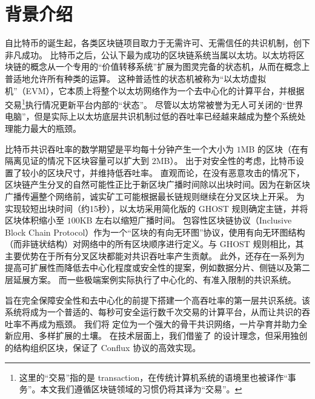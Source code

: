 

\section{背景介绍}


自比特币的诞生起，各类区块链项目取力于无需许可、无需信任的共识机制，创下非凡成功。
比特币之后，公认下最为成功的区块链系统当属以太坊。以太坊将区块链的概念从一个专用的“价值转移系统”扩展为图灵完备的状态机，从而在概念上普适地允许所有种类的运算。
这种普适性的状态机被称为“以太坊虚拟机”（EVM），它本质上将整个以太坊网络作为一个去中心化的计算平台，并根据交易\footnote{这里的“交易”指的是 transaction，在传统计算机系统的语境里也被译作“事务”。本文我们遵循区块链领域的习惯仍将其译为“交易”。}执行情况更新平台内部的“状态”。
尽管以太坊常被誉为无人可关闭的“世界电脑”，但是实际上以太坊底层共识机制过低的吞吐率已经越来越成为整个系统处理能力最大的瓶颈。


比特币共识吞吐率的数学期望是平均每十分钟产生一个大小为 $1$MB 的区块（在有隔离见证的情况下区块容量可以扩大到 $2$MB）。
出于对安全性的考虑，比特币设置了较小的区块尺寸，并维持低吞吐率。
直观而论，在没有恶意攻击的情况下，区块链产生分叉的自然可能性正比于新区块广播时间除以出块时间。因为在新区块广播传遍整个网络前，诚实矿工可能根据最长链规则继续在分叉区块上开采。
为实现较短出块时间（约15秒），以太坊采用简化版的 GHOST 规则\cite{GHOST}确定主链，并将区块体积缩小至 $100$KB 左右以缩短广播时间。
包容性区块链协议（Inclusive Block Chain Protocol）\cite{Inclusive}作为一个“区块的有向无环图”协议，使用有向无环图结构（而非链状结构）对网络中的所有区块顺序进行定义。与 GHOST 规则相比，其主要优势在于所有分叉区块都能对共识吞吐率产生贡献。
此外，还存在一系列为提高可扩展性而降低去中心化程度或安全性的提案，例如数据分片、侧链以及第二层延展方案。
而一些极端案例实际执行了中心化的、有准入限制的共识系统。


{\name} 旨在完全保障安全性和去中心化的前提下搭建一个高吞吐率的第一层共识系统。该系统将成为一个普适的、每秒可安全运行数千次交易的计算平台，从而让共识的吞吐率不再成为瓶颈。
我们将{\name} 定位为一个强大的骨干共识网络，一片孕育并助力全新应用、多样扩展的土壤。
在技术层面上，我们借鉴了 \cite{Inclusive} 的设计理念，但采用独创的\tg 结构组织区块，保证了 Conflux 协议的高效实现。
